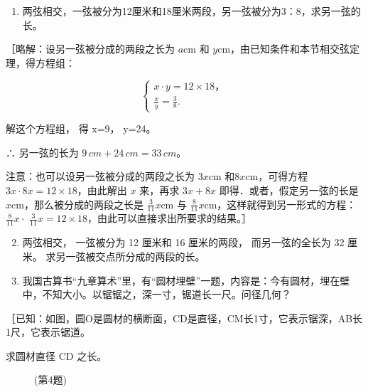 \begin{enumerate}
\item
  两弦相交，一弦被分为12厘米和18厘米两段，另一弦被分为3：8，求另一弦的长。
\end{enumerate}

［略解：设另一弦被分成的两段之长为 \(a\mathrm{cm}\) 和
\(y\mathrm{cm}\)，由已知条件和本节相交弦定理，得方程组：

\[
\left\{ \begin{array}{l} x \cdot y = 12 \times 18\text{，} \\ \frac {x}{y} = \frac {3}{8}. \end{array} \right.
\]

解这个方程组， 得 x=9， y=24。

∴ 另一弦的长为 \(9 \, cm + 24 \, cm = 33 \, cm\)。

注意：也可以设另一弦被分成的两段之长为 \(3x\mathrm{cm}\)
和\(8x\mathrm{cm}\)，可得方程 \(3x\cdot 8x = 12\times 18\)，由此解出
\(x\) 来，再求 \(3x + 8x\) 即得．或者，假定另一弦的长是
\(x\mathrm{cm}\)，那么被分成的两段之长是 \(\frac{3}{11} x\mathrm{cm}\)
与 \(\frac{8}{11} x\mathrm{cm}\)，这样就得到另一形式的方程：
\(\frac{8}{11} x\cdot\)
\(\frac{3}{11} x = 12\times 18\)，由此可以直接求出所要求的结果。］

\begin{enumerate}
\setcounter{enumi}{1}
\item
  两弦相交， 一弦被分为 12 厘米和 16 厘米的两段， 而另一弦的全长为 32
  厘米。 求另一弦被交点所分成的两段的长。
\item
  我国古算书``九章算术''里，有``圆材埋壁''一题，内容是：今有圆材，埋在壁中，不知大小。以锯锯之，深一寸，锯道长一尺。问径几何？
\end{enumerate}

［已知：如图，圆O是圆材的横断面，CD是直径，CM长1寸，它表示锯深，AB长1尺，它表示锯道。

求圆材直径 CD 之长。

\begin{figure}
\centering
{}
\caption{(第4题)}
\end{figure}

